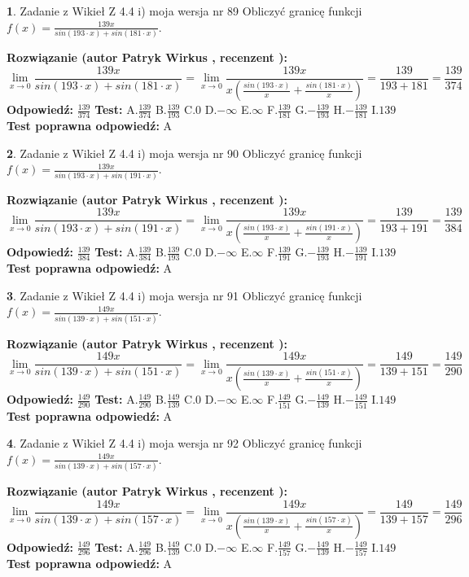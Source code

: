 \documentclass[12pt, a4paper]{article}
\theoremstyle{definition} %
\newtheorem{zad}{}
\newcommand{\zadStart}[1]{\begin{zad}#1\newline}
\newcommand{\zadStop}{\end{zad}}
\newcommand{\rozwStart}[2]{\noindent \textbf{Rozwiązanie (autor #1 , recenzent #2): }\newline}
\newcommand{\rozwStop}{\newline}
\newcommand{\odpStart}{\noindent \textbf{Odpowiedź:}\newline}
\newcommand{\odpStop}{\newline}
\newcommand{\testStart}{\noindent \textbf{Test:}\newline}
\newcommand{\testStop}{\newline}
\newcommand{\kluczStart}{\noindent \textbf{Test poprawna odpowiedź:}\newline}
\newcommand{\kluczStop}{\newline}
\begin{document}
\zadStart{Zadanie z Wikieł Z 4.4 i) moja wersja nr 89}
Obliczyć granicę funkcji $f(x)=\frac{139x}{sin(193\cdot x) +sin(181\cdot x)}$.
\zadStop
\rozwStart{Patryk Wirkus}{}
$$\lim\limits_{x\to 0}\frac{139x}{sin(193\cdot x) +sin(181\cdot x)}=\lim\limits_{x\to 0}\frac{139x}{x(\frac{sin(193\cdot x)}{x}+\frac{sin(181\cdot x)}{x})}=\frac{139}{193+181} = \frac{139}{374}$$
\rozwStop
\odpStart
$\frac{139}{374}$
\odpStop
\testStart
A.$\frac{139}{374}$
B.$\frac{139}{193}$
C.$0$
D.$-\infty$
E.$\infty$
F.$\frac{139}{181}$
G.$-\frac{139}{193}$
H.$-\frac{139}{181}$
I.$139$
\testStop
\kluczStart
A
\kluczStop



\zadStart{Zadanie z Wikieł Z 4.4 i) moja wersja nr 90}
Obliczyć granicę funkcji $f(x)=\frac{139x}{sin(193\cdot x) +sin(191\cdot x)}$.
\zadStop
\rozwStart{Patryk Wirkus}{}
$$\lim\limits_{x\to 0}\frac{139x}{sin(193\cdot x) +sin(191\cdot x)}=\lim\limits_{x\to 0}\frac{139x}{x(\frac{sin(193\cdot x)}{x}+\frac{sin(191\cdot x)}{x})}=\frac{139}{193+191} = \frac{139}{384}$$
\rozwStop
\odpStart
$\frac{139}{384}$
\odpStop
\testStart
A.$\frac{139}{384}$
B.$\frac{139}{193}$
C.$0$
D.$-\infty$
E.$\infty$
F.$\frac{139}{191}$
G.$-\frac{139}{193}$
H.$-\frac{139}{191}$
I.$139$
\testStop
\kluczStart
A
\kluczStop



\zadStart{Zadanie z Wikieł Z 4.4 i) moja wersja nr 91}
Obliczyć granicę funkcji $f(x)=\frac{149x}{sin(139\cdot x) +sin(151\cdot x)}$.
\zadStop
\rozwStart{Patryk Wirkus}{}
$$\lim\limits_{x\to 0}\frac{149x}{sin(139\cdot x) +sin(151\cdot x)}=\lim\limits_{x\to 0}\frac{149x}{x(\frac{sin(139\cdot x)}{x}+\frac{sin(151\cdot x)}{x})}=\frac{149}{139+151} = \frac{149}{290}$$
\rozwStop
\odpStart
$\frac{149}{290}$
\odpStop
\testStart
A.$\frac{149}{290}$
B.$\frac{149}{139}$
C.$0$
D.$-\infty$
E.$\infty$
F.$\frac{149}{151}$
G.$-\frac{149}{139}$
H.$-\frac{149}{151}$
I.$149$
\testStop
\kluczStart
A
\kluczStop



\zadStart{Zadanie z Wikieł Z 4.4 i) moja wersja nr 92}
Obliczyć granicę funkcji $f(x)=\frac{149x}{sin(139\cdot x) +sin(157\cdot x)}$.
\zadStop
\rozwStart{Patryk Wirkus}{}
$$\lim\limits_{x\to 0}\frac{149x}{sin(139\cdot x) +sin(157\cdot x)}=\lim\limits_{x\to 0}\frac{149x}{x(\frac{sin(139\cdot x)}{x}+\frac{sin(157\cdot x)}{x})}=\frac{149}{139+157} = \frac{149}{296}$$
\rozwStop
\odpStart
$\frac{149}{296}$
\odpStop
\testStart
A.$\frac{149}{296}$
B.$\frac{149}{139}$
C.$0$
D.$-\infty$
E.$\infty$
F.$\frac{149}{157}$
G.$-\frac{149}{139}$
H.$-\frac{149}{157}$
I.$149$
\testStop
\kluczStart
A
\kluczStop
\end{document}
